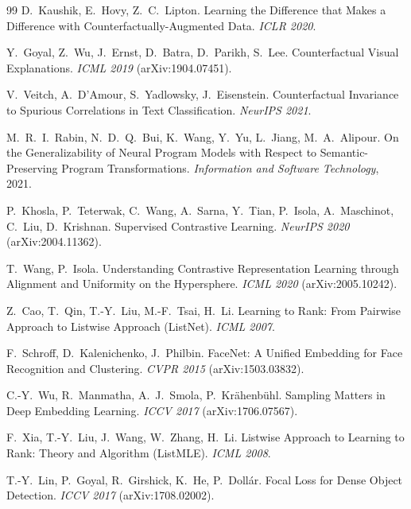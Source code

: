 \documentclass[10pt]{article}
\begin{document}
\begin{thebibliography}{99}
D.~Kaushik, E.~Hovy, Z.~C.~Lipton.
\newblock Learning the Difference that Makes a Difference with
Counterfactually-Augmented Data.
\newblock \emph{ICLR 2020}.

Y.~Goyal, Z.~Wu, J.~Ernst, D.~Batra, D.~Parikh, S.~Lee.
\newblock Counterfactual Visual Explanations.
\newblock \emph{ICML 2019} (arXiv:1904.07451).

V.~Veitch, A.~D'Amour, S.~Yadlowsky, J.~Eisenstein.
\newblock Counterfactual Invariance to Spurious Correlations in Text
Classification.
\newblock \emph{NeurIPS 2021}.

M.~R.~I.~Rabin, N.~D.~Q.~Bui, K.~Wang, Y.~Yu, L.~Jiang, M.~A.~Alipour.
\newblock On the Generalizability of Neural Program Models with Respect to
Semantic-Preserving Program Transformations.
\newblock \emph{Information and Software Technology}, 2021.

P.~Khosla, P.~Teterwak, C.~Wang, A.~Sarna, Y.~Tian, P.~Isola, A.~Maschinot,
C.~Liu, D.~Krishnan.
\newblock Supervised Contrastive Learning.
\newblock \emph{NeurIPS 2020} (arXiv:2004.11362).

T.~Wang, P.~Isola.
\newblock Understanding Contrastive Representation Learning through Alignment
  and Uniformity on the Hypersphere.
\newblock \emph{ICML 2020} (arXiv:2005.10242).

Z.~Cao, T.~Qin, T.-Y.~Liu, M.-F.~Tsai, H.~Li.
\newblock Learning to Rank: From Pairwise Approach to Listwise Approach
  (ListNet).
\newblock \emph{ICML 2007}.

F.~Schroff, D.~Kalenichenko, J.~Philbin.
\newblock FaceNet: A Unified Embedding for Face Recognition and Clustering.
\newblock \emph{CVPR 2015} (arXiv:1503.03832).

C.-Y.~Wu, R.~Manmatha, A.~J.~Smola, P.~Krähenbühl.
\newblock Sampling Matters in Deep Embedding Learning.
\newblock \emph{ICCV 2017} (arXiv:1706.07567).

F.~Xia, T.-Y.~Liu, J.~Wang, W.~Zhang, H.~Li.
\newblock Listwise Approach to Learning to Rank: Theory and Algorithm
  (ListMLE).
\newblock \emph{ICML 2008}.

T.-Y.~Lin, P.~Goyal, R.~Girshick, K.~He, P.~Dollár.
\newblock Focal Loss for Dense Object Detection.
\newblock \emph{ICCV 2017} (arXiv:1708.02002).

\end{thebibliography}
\end{document}
